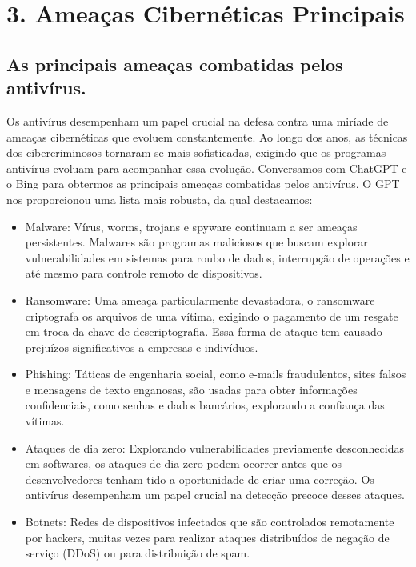 \documentclass[10pt,conference,twocolumn]{article}
\begin{document}
\section* {3. Ameaças Cibernéticas Principais}

\subsection*{As principais ameaças combatidas pelos antivírus.}
Os antivírus desempenham um papel crucial na defesa contra uma miríade de ameaças cibernéticas que evoluem constantemente. Ao longo dos anos, as técnicas dos cibercriminosos tornaram-se mais sofisticadas, exigindo que os programas antivírus evoluam para acompanhar essa evolução. Conversamos com ChatGPT e o Bing para obtermos as principais ameaças combatidas pelos antivírus. O GPT nos proporcionou uma lista mais robusta, da qual destacamos:
\begin{itemize}
\item
Malware: Vírus, worms, trojans e spyware continuam a ser ameaças persistentes. Malwares são programas maliciosos que buscam explorar vulnerabilidades em sistemas para roubo de dados, interrupção de operações e até mesmo para controle remoto de dispositivos.
\item 
Ransomware: Uma ameaça particularmente devastadora, o ransomware criptografa os arquivos de uma vítima, exigindo o pagamento de um resgate em troca da chave de descriptografia. Essa forma de ataque tem causado prejuízos significativos a empresas e indivíduos.
\item 
Phishing: Táticas de engenharia social, como e-mails fraudulentos, sites falsos e mensagens de texto enganosas, são usadas para obter informações confidenciais, como senhas e dados bancários, explorando a confiança das vítimas.
\item 
Ataques de dia zero: Explorando vulnerabilidades previamente desconhecidas em softwares, os ataques de dia zero podem ocorrer antes que os desenvolvedores tenham tido a oportunidade de criar uma correção. Os antivírus desempenham um papel crucial na detecção precoce desses ataques.
\item
Botnets: Redes de dispositivos infectados que são controlados remotamente por hackers, muitas vezes para realizar ataques distribuídos de negação de serviço (DDoS) ou para distribuição de spam.
\end{itemize}
\end{document}
